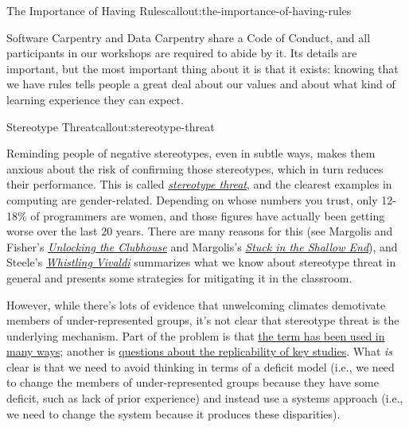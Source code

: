 \begin{callout}{The Importance of Having Rules}{callout:the-importance-of-having-rules}

Software Carpentry and Data Carpentry share a
Code of Conduct, and all
participants in our workshops are required to abide by it. Its details
are important, but the most important thing about it is that it exists:
knowing that we have rules tells people a great deal about our values
and about what kind of learning experience they can expect.
\end{callout}

\begin{callout}{Stereotype Threat}{callout:stereotype-threat}

Reminding people of negative stereotypes, even in subtle ways, makes
them anxious about the risk of confirming those stereotypes, which in
turn reduces their performance. This is called
\emph{\href{https://en.wikipedia.org/wiki/Stereotype\_threat}{stereotype
threat}}, and the clearest examples in computing are gender-related.
Depending on whose numbers you trust, only 12-18\% of programmers are
women, and those figures have actually been getting worse over the last
20 years. There are many reasons for this (see Margolis and Fisher's
\emph{\href{http://www.amazon.com/Unlocking-Clubhouse-Computing-Jane-Margolis/dp/0262632691/}{Unlocking
the Clubhouse}} and Margolis's
\emph{\href{https://www.amazon.com/Stuck-Shallow-End-Education-Computing/dp/0262514044/}{Stuck
in the Shallow End}}), and Steele's
\emph{\href{http://www.amazon.com/dp/0393339726/}{Whistling Vivaldi}}
summarizes what we know about stereotype threat in general and presents
some strategies for mitigating it in the classroom.

However, while there's lots of evidence that unwelcoming climates
demotivate members of under-represented groups, it's not clear that
stereotype threat is the underlying mechanism. Part of the problem is
that
\href{http://www.europhd.net/html/\_onda02/07/PDF/20th\_lab\_materials/jane/shapiro\_neuberg\_2007.pdf}{the
term has been used in many ways}; another is
\href{https://www.psychologytoday.com/blog/rabble-rouser/201512/is-stereotype-threat-overcooked-overstated-and-oversold}{questions
about the replicability of key studies}. What \emph{is} clear is that we
need to avoid thinking in terms of a deficit model (i.e., we need to
change the members of under-represented groups because they have some
deficit, such as lack of prior experience) and instead use a systems
approach (i.e., we need to change the system because it produces these
disparities).
\end{callout}

